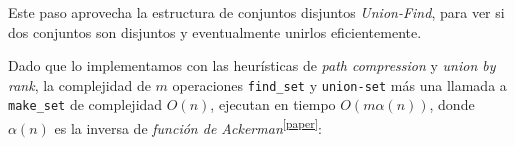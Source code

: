 	



Este paso aprovecha la estructura de conjuntos disjuntos \textit{Union-Find}, para ver si dos conjuntos son disjuntos y eventualmente unirlos eficientemente. 

\newpage

Dado que lo implementamos con las heur\'isticas de \textit{path compression} y \textit{union by rank}, la complejidad de $m$ operaciones \texttt{find_set} y \texttt{union-set} m\'as una llamada a \texttt{make_set} de complejidad $O(n)$, ejecutan en tiempo $O(m\alpha(n))$, donde $\alpha(n)$ es la inversa de\emph{ funci\'on de Ackerman}\textsuperscript{\ref{paper}}:

